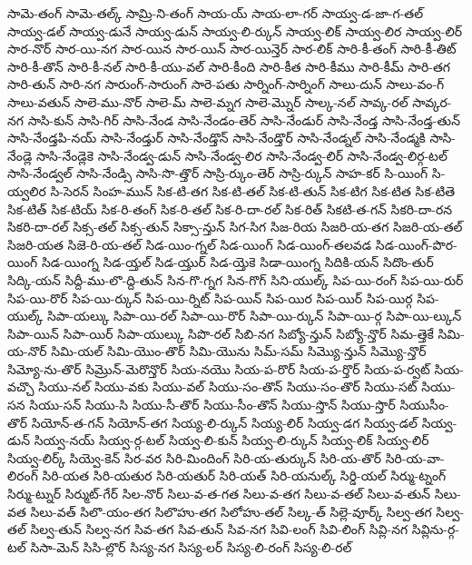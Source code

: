 {సామె-తంగ్
సామె-తల్క్
సామ్రి-ని-తంగ్
సాయ-య్
సాయ-లా-గర్
సాయ్వ-డ-జా-గ-తల్
సాయ్వ-డల్
సాయ్వ-డునే
సాయ్వ-డున్
సాయ్వ-లి-ర్కున్
సాయ్వ-లిక్
సాయ్వ-లిర
సాయ్వ-లిర్
సార-నొర్
సార-యి-నగ
సార-యిన
సార-యిన్
సార-యిన్తెర్
సార-లిక్
సారి-కీ-తంగ్
సారి-కీ-తిట్
సారి-కీ-తొన్
సారి-కీ-నల్
సారి-కీ-యు-వల్
సారి-కీంది
సారి-కీత
సారి-కీము
సారి-కీమ్
సారి-తగ
సారి-తున్
సారి-నగ
సారుంగ్-సారుంగ్
సారె-పతు
సార్నింగ్-సార్నింగ్
సాలు-దున్
సాలు-వం-గ్
సాలు-వతున్
సాలె-ము-నొర్
సాలె-మ్
సాలె-మ్నగ
సాలె-మ్నొర్
సాల్క-నల్
సావ్క-రల్
సావ్కర-నగ
సాసి-కున్
సాసి-గిర్
సాసి-నేండ
సాసి-నేండం-తెర్
సాసి-నేండుర్
సాసి-నేండ్త
సాసి-నేండ్త-తున్
సాసి-నేండ్తపి-నయ్
సాసి-నేండ్తుర్
సాసి-నేండ్తొన్
సాసి-నేండ్తొర్
సాసి-నేండ్నల్
సాసి-నేండ్మకి
సాసి-నేండ్లె
సాసి-నేండ్లెకె
సాసి-నేండ్వ-డున్
సాసి-నేండ్వ-లిర
సాసి-నేండ్వ-లిర్
సాసి-నేండ్వ-లిర్గ-టల్
సాసి-నేండ్వల్
సాసి-నేండ్సి
సాసి-సొ-త్తొర్
సాస్రి-ర్కుం-తెర్
సాస్రి-ర్కున్
సాహ-కర్
సి-యింగ్
సి-య్వలిర
సి-సెరన్
సింహ-మున్
సిక-టి-తగ
సిక-టి-తల్
సిక-టి-తున్
సిక-టిగ
సిక-టిత
సిక-టితె
సిక-టిత్
సిక-టియ్
సిక-రి-తంగ్
సిక-రి-తల్
సిక-రి-దా-రల్
సిక-రిత్
సికటి-త-గన్
సికరి-దా-రన
సికరి-దా-రల్
సిక్స-తల్
సిక్స-తున్
సిక్సా-న్తున్
సిగ-సిగ
సిజ-రియ
సిజరి-య-తగ
సిజరి-య-తల్
సిజరి-యత
సిజె-రి-య-తల్
సిడ-యిం-గ్నల్
సిడ-యింగ్
సిడ-యింగ్-తలవడ
సిడ-యింగ్-పొర-యింగ్
సిడ-యింగ్న
సిడ-య్తల్
సిడ-య్తుర్
సిడ-య్తెకె
సిడా-యింగ్న
సిదికి-యన్
సిదొం-తుర్
సిద్కి-యన్
సిద్దీ-ము-లొ-ద్ది-తున్
సిన-గొ-గ్నగ
సిన-గొగ్
సిని-యుల్క్
సిప-యి-రంగ్
సిప-యి-రుర్
సిప-యి-రొర్
సిప-యి-ర్కున్
సిప-యి-ర్నిట్
సిప-యిన్
సిప-యిర
సిప-యిర్
సిప-యిర్గ
సిప-యుల్క్
సిపా-యల్కు
సిపా-యి-రల్
సిపా-యి-రొర్
సిపా-యి-ర్కున్
సిపా-యి-ర్గ
సిపా-యి-ల్కున్
సిపా-యిన్
సిపా-యిర్
సిపా-యుల్కు
సిపొ-రల్
సిబి-నగ
సిబ్యో-న్తున్
సిబ్యో-న్తొర్
సిమ-త్తెకే
సిమి-య-నొర్
సిమి-యల్
సిమి-యొం-తొర్
సిమి-యొను
సిమ్-సమ్
సిమ్యొ-న్తున్
సిమ్యొ-న్తొర్
సిమ్యో-ను-తొర్
సిమ్రొన్-మెరొన్తొర్
సియ-నయొ
సియ-ప-రొర్
సియ-ప-ర్తొర్
సియ-ప-ర్వట్
సియ-వచ్చొ
సియు-నల్
సియు-వకు
సియు-వల్
సియు-సం-తొన్
సియు-సం-తొర్
సియు-సట్
సియు-సన
సియు-సన్
సియు-సి
సియు-సీ-తొర్
సియు-సీం-తొన్
సియు-స్తొన్
సియు-స్తొర్
సియుసీం-తొర్
సియోన్-త-గన్
సియోన్-తగ
సియ్య-లి-ర్కున్
సియ్య-లిర్
సియ్వ-డగ
సియ్వ-డల్
సియ్వ-డున్
సియ్వ-నయ్
సియ్వ-ర్గ-టల్
సియ్వ-లి-కున్
సియ్వ-లి-ర్కున్
సియ్వ-లిక్
సియ్వ-లిర్
సియ్వ-లిర్క్
సియ్వె-కెన్
సిర-వర
సిరి-మిందింగ్
సిరి-య-తుర్కున్
సిరి-య-తొర్
సిరి-య-వా-లిరంగ్
సిరి-యత
సిరి-యతుర
సిరి-యతుర్
సిరి-యత్
సిరి-యనుల్క్
సిర్డి-యల్
సిర్ము-ట్నంగ్
సిర్ము-ట్నుర్
సిర్ముట్-గేర్
సిల-నొర్
సిలు-వ-త-గత
సిలు-వ-తగ
సిలు-వ-తల్
సిలు-వ-తున్
సిలు-వత
సిలు-వత్
సిలొ-యం-తగ
సిలొహు-తగ
సిలోహు-తల్
సిల్క-త్
సిల్లె-వూర్క్
సిల్వ-తగ
సిల్వ-తల్
సిల్వ-తున్
సిల్వ-నగ
సివ-తగ
సివ-తున్
సివ-నగ
సివి-లంగ్
సివి-లింగ్
సివ్లి-నగ
సివ్లిను-ర్గ-టల్
సిసా-మెన్
సిసి-ల్లొర్
సిస్య-నగ
సిస్య-లర్
సిస్య-లి-రంగ్
సిస్య-లి-రల్
}
